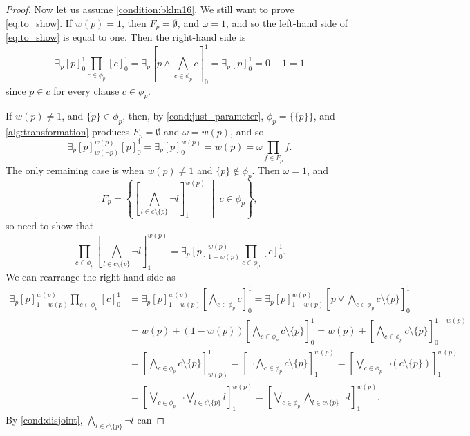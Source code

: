 \documentclass[runningheads]{llncs}
\begin{document}
\begin{proof}
  Now let us assume \cref{condition:bklm16}. We still want to prove
  \cref{eq:to_show}. If $w(p) = 1$, then $F_p = \emptyset$, and $\omega = 1$,
  and so the left-hand side of \cref{eq:to_show} is equal to one. Then the
  right-hand side is
  \[
    \exists_p [p]_0^1 \prod_{c \in \phi_p} [c]_0^1 = \exists_p \left[ p \land
      \bigwedge_{c \in \phi_p} c \right]_0^1 = \exists_p [p]_0^1 = 0 + 1 = 1
  \]
  since $p \in c$ for every clause $c \in \phi_p$.

  If $w(p) \ne 1$, and $\{ p \} \in \phi_p$, then, by
  \cref{cond:just_parameter}, $\phi_p = \{ \{ p \} \}$, and
  \cref{alg:transformation} produces $F_p = \emptyset$ and $\omega = w(p)$, and
  so
  \[
    \exists_p [p]_{w(\neg p)}^{w(p)} [p]_0^1 = \exists_p [p]^{w(p)}_0 = w(p) =
    \omega \prod_{f \in F_p} f.
  \]
  The only remaining case is when $w(p) \ne 1$ and $\{ p \} \not \in \phi_p$.
  Then $\omega = 1$, and
  \[
    F_p = \left\{ \left[\bigwedge_{l \in c \setminus \{ p \}} \neg
        l\right]_1^{w(p)} \;\middle|\; c \in \phi_p \right\},
  \]
  so need to show that
  \[
    \prod_{c \in \phi_p} \left[\bigwedge_{l \in c \setminus \{ p \}} \neg
      l\right]_1^{w(p)} = \exists_p [p]_{1-w(p)}^{w(p)} \prod_{c \in \phi_p}
    [c]_0^1.
  \]
  We can rearrange the right-hand side as %
  \begin{align*}
    \exists_p [p]_{1-w(p)}^{w(p)} \prod_{c \in \phi_p} [c]_0^1 &= \exists_p [p]_{1-w(p)}^{w(p)} \left[\bigwedge_{c \in \phi_p} c\right]_0^1 = \exists_p [p]_{1-w(p)}^{w(p)} \left[ p \lor \bigwedge_{c \in \phi_p} c \setminus \{ p \} \right]_0^1 \\
                                                               &= w(p) + (1-w(p)) \left[ \bigwedge_{c \in \phi_p} c \setminus \{ p \} \right]_0^1 = w(p) + \left[ \bigwedge_{c \in \phi_p} c \setminus \{ p \} \right]_0^{1-w(p)} \\
                                                               &= \left[ \bigwedge_{c \in \phi_p} c \setminus \{ p \} \right]_{w(p)}^1 = \left[ \neg \bigwedge_{c \in \phi_p} c \setminus \{ p \} \right]_1^{w(p)} = \left[ \bigvee_{c \in \phi_p} \neg(c \setminus \{ p \}) \right]_1^{w(p)} \\
                                                               &= \left[ \bigvee_{c \in \phi_p} \neg \bigvee_{l \in c \setminus \{ p \}} l \right]_1^{w(p)} = \left[ \bigvee_{c \in \phi_p} \bigwedge_{l \in c \setminus \{ p \}} \neg l \right]_1^{w(p)}.
  \end{align*}
   By \cref{cond:disjoint}, $\bigwedge_{l \in c \setminus \{ p \}} \neg l$ can

\end{proof}
\end{document}
